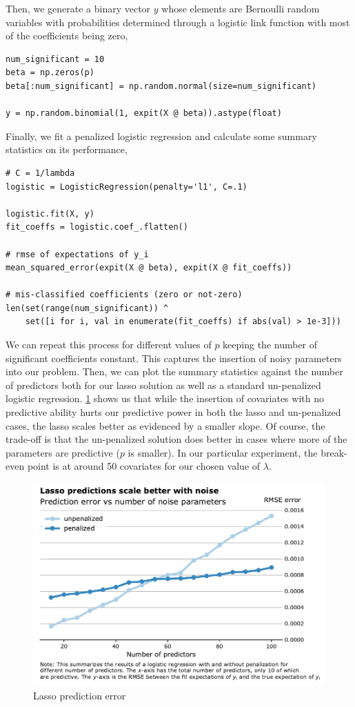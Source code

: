 \documentclass[letterpaper, 12pt]{article}
\begin{document}
Then, we generate a binary vector $y$ whose elements are Bernoulli random
variables with probabilities determined through a logistic link function with
most of the coefficients being zero,

\begin{lstlisting}
num_significant = 10
beta = np.zeros(p)
beta[:num_significant] = np.random.normal(size=num_significant)

y = np.random.binomial(1, expit(X @ beta)).astype(float)
\end{lstlisting}

Finally, we fit a penalized logistic regression and calculate some summary
statistics on its performance,

\begin{lstlisting}
# C = 1/lambda
logistic = LogisticRegression(penalty='l1', C=.1)

logistic.fit(X, y)
fit_coeffs = logistic.coef_.flatten()

# rmse of expectations of y_i
mean_squared_error(expit(X @ beta), expit(X @ fit_coeffs))

# mis-classified coefficients (zero or not-zero)
len(set(range(num_significant)) ^ 
    set([i for i, val in enumerate(fit_coeffs) if abs(val) > 1e-3]))
\end{lstlisting}

We can repeat this process for different values of $p$ keeping the number of
significant coefficients constant. This captures the insertion of noisy
parameters into our problem. Then, we can plot the summary statistics against
the number of predictors both for our lasso solution as well as a standard
un-penalized logistic regression. \cref{fig:lasso-pred-err} shows us that while
the insertion of covariates with no predictive ability hurts our predictive
power in both the lasso and un-penalized cases, the lasso scales better as
evidenced by a smaller slope. Of course, the trade-off is that the un-penalized
solution does better in cases where more of the parameters are predictive ($p$
is smaller). In our particular experiment, the break-even point is at around 50
covariates for our chosen value of $\lambda$.

\begin{figure}[h]
\centering
\includegraphics[width=.8\textwidth]{figs/lasso-pred-error}
\caption{Lasso prediction error}
\label{fig:lasso-pred-err}
\end{figure}
\end{document}
